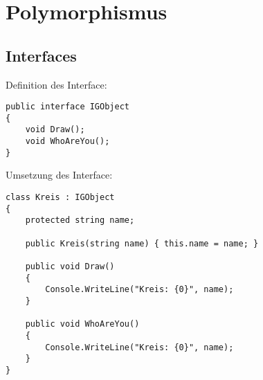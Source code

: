 \newpage
\section{Polymorphismus}

\subsection{Interfaces}
Definition des Interface: 

\begin{lstlisting}[style=Csharp]
public interface IGObject
{
    void Draw();
    void WhoAreYou();
}
\end{lstlisting}

Umsetzung des Interface:
\begin{lstlisting}[style=Csharp]
class Kreis : IGObject
{
    protected string name;

    public Kreis(string name) { this.name = name; }

    public void Draw()
    {
        Console.WriteLine("Kreis: {0}", name);
    }
        
    public void WhoAreYou()
    {
        Console.WriteLine("Kreis: {0}", name);
    }
}
\end{lstlisting}